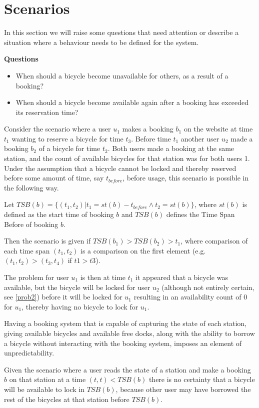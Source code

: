 \section{Scenarios}\label{sec:behaviourProblems}
In this section we will raise some questions that need attention or describe a situation where a behaviour needs to be defined for the system.

\textbf{Questions}
\begin{itemize}
\item When should a bicycle become unavailable for others, as a result of a booking?
\item When should a bicycle become available again after a booking has exceeded its reservation time?
\end{itemize}

\begin{description}[style=nextline]\label{prob1}
\item[Problem 1.1] Consider the scenario where a user $u_1$ makes a booking $b_1$ on the website at time $t_1$ wanting to reserve a bicycle for time $t_3$. Before time $t_1$ another user $u_2$ made a booking $b_2$ of a bicycle for time $t_2$. Both users made a booking at the same station, and the count of available bicycles for that station was for both users 1. Under the assumption that a bicycle cannot be locked and thereby reserved before some amount of time, say $t_{before}$, before usage, this scenario is possible in the following way.

Let $TSB(b) = \{(t_1,t_2) | t_1 = st(b) - t_{before} \wedge t_2 = st(b) \}$, where $st(b)$ is defined as the start time of booking $b$ and $TSB(b)$ defines the Time Span Before of booking $b$.

Then the scenario is given if $TSB(b_1) > TSB(b_2) > t_1$, where comparison of each time span $(t_1, t_2)$ is a comparison on the first element (e.g. $(t_1, t_2) > (t_3, t_4)$ if $t1 > t3$).

The problem for user $u_1$ is then at time $t_1$ it appeared that a bicycle was available, but the bicycle will be locked for user $u_2$ (although not entirely certain, see \ref{prob2}) before it will be locked for $u_1$ resulting in an availability count of 0 for $u_1$, thereby having no bicycle to lock for $u_1$.
\end{description}

\begin{description}\label{prob2}
	\item[Problem 1.2] Having a booking system that is capable of capturing the state of each station, giving available bicycles and available free docks, along with the ability to borrow a bicycle without interacting with the booking system, imposes an element of unpredictability.
	
	Given the scenario where a user reads the state of a station and make a booking $b$ on that station at a time $(t,t) < TSB(b)$ there is no certainty that a bicycle will be available to lock in $TSB(b)$, because other user may have borrowed the rest of the bicycles at that station before $TSB(b)$.
\end{description}


